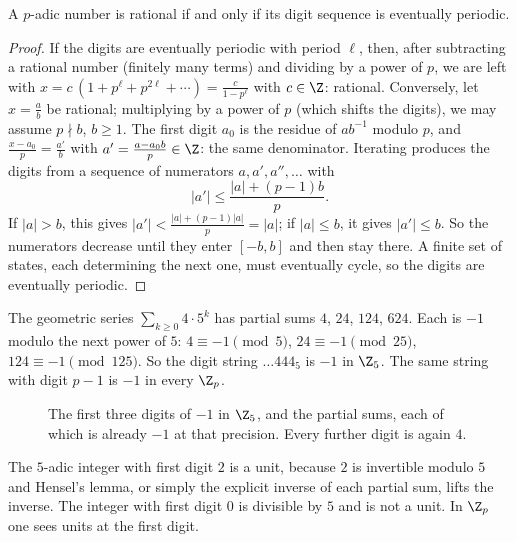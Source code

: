 \begin{proposition}\label{prop:periodic}
A $p$-adic number is rational if and only if its digit sequence is eventually periodic.
\end{proposition}
\begin{proof}
If the digits are eventually periodic with period $\ell$, then, after subtracting a rational number (finitely many terms) and dividing by a power of $p$, we are left with $x=c\,(1+p^\ell+p^{2\ell}+\cdots)=\frac c{1-p^\ell}$ with $c\in\Z$: rational. Conversely, let $x=\frac ab$ be rational; multiplying by a power of $p$ (which shifts the digits), we may assume $p\nmid b$, $b\ge1$. The first digit $a_0$ is the residue of $ab^{-1}$ modulo $p$, and $\frac{x-a_0}p=\frac{a'}b$ with $a'=\frac{a-a_0b}p\in\Z$: the same denominator. Iterating produces the digits from a sequence of numerators $a,a',a'',\dots$ with
\[
|a'|\le\frac{|a|+(p-1)b}p.
\]
If $|a|>b$, this gives $|a'|<\frac{|a|+(p-1)|a|}p=|a|$; if $|a|\le b$, it gives $|a'|\le b$. So the numerators decrease until they enter $[-b,b]$ and then stay there. A finite set of states, each determining the next one, must eventually cycle, so the digits are eventually periodic.
\end{proof}

\begin{examplex}
The geometric series $\sum_{k\ge 0}4\cdot 5^k$ has partial sums $4$, $24$, $124$, $624$. Each is $-1$ modulo the next power of $5$: $4\equiv -1\pmod 5$, $24\equiv -1\pmod{25}$, $124\equiv -1\pmod{125}$. So the digit string $\ldots 444_5$ is $-1$ in $\Z_5$. The same string with digit $p-1$ is $-1$ in every $\Z_p$.
\end{examplex}

\begin{figure}[ht]
\centering
{}
\caption{The first three digits of $-1$ in $\Z_5$, and the partial sums, each of which is already $-1$ at that precision. Every further digit is again $4$.}
\label{fig:t1-minusone}
\end{figure}

\begin{examplex}
The $5$-adic integer with first digit $2$ is a unit, because $2$ is invertible modulo $5$ and Hensel's lemma, or simply the explicit inverse of each partial sum, lifts the inverse. The integer with first digit $0$ is divisible by $5$ and is not a unit. In $\Z_p$ one sees units at the first digit.
\end{examplex}

